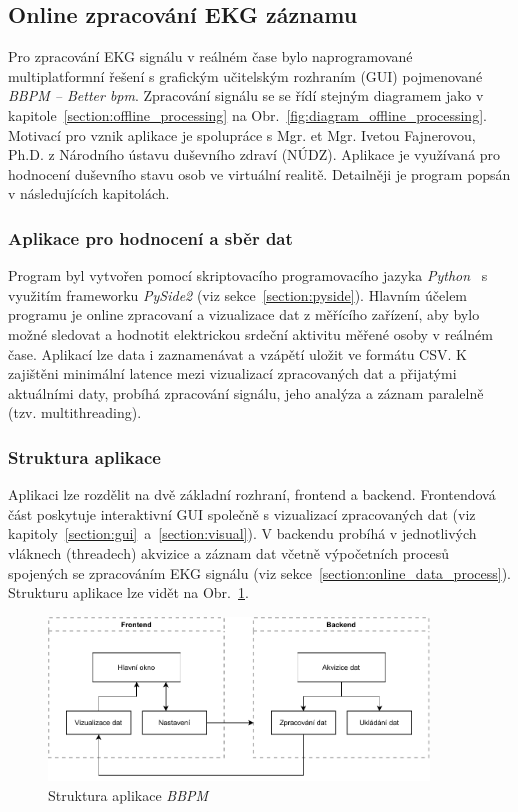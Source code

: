 \subsection{Online zpracování EKG záznamu}
\label{section:online_processing}
Pro zpracování EKG signálu v reálném čase bylo naprogramované multiplatformní
řešení s grafickým učitelským rozhraním (GUI) pojmenované \textit{BBPM -- Better
bpm}. Zpracování signálu se se řídí stejným diagramem jako v
kapitole~\ref{section:offline_processing} na
Obr.~\ref{fig:diagram_offline_processing}. Motivací pro vznik aplikace je
spolupráce s Mgr. et Mgr. Ivetou Fajnerovou, Ph.D. z Národního ústavu duševního
zdraví (NÚDZ). Aplikace je využívaná pro hodnocení duševního stavu osob ve
virtuální realitě. Detailněji je program popsán v následujících kapitolách.

\subsubsection{Aplikace pro hodnocení a sběr dat}
Program byl vytvořen pomocí skriptovacího programovacího jazyka
\textit{Python}~\cite{python} s využitím frameworku \textit{PySide2} (viz
sekce~\ref{section:pyside}). Hlavním účelem programu je online zpracovaní a
vizualizace dat z měřícího zařízení, aby bylo možné sledovat a hodnotit
elektrickou srdeční aktivitu měřené osoby v reálném čase. Aplikací lze data i
zaznamenávat a vzápětí uložit ve formátu CSV. K zajištěni minimální latence mezi
vizualizací zpracovaných dat a přijatými aktuálními daty, probíhá zpracování
signálu, jeho analýza a záznam paralelně (tzv. multithreading).

\subsubsection{Struktura aplikace}
Aplikaci lze rozdělit na dvě základní rozhraní, frontend a backend. Frontendová
část poskytuje interaktivní GUI společně s vizualizací zpracovaných dat (viz
kapitoly~\ref{section:gui}~a~\ref{section:visual}). V backendu probíhá v
jednotlivých vláknech (threadech) akvizice a záznam dat včetně výpočetních
procesů spojených se zpracováním EKG signálu (viz
sekce~\ref{section:online_data_process}). Strukturu aplikace lze vidět na
Obr.~\ref{fig:app_structure}.

\begin{figure}[h]
    \begin{center}
        \includegraphics[width=0.9\textwidth]{../assets/diagrams/app_structure}
        \caption{Struktura aplikace \textit{BBPM}}
        \label{fig:app_structure}
    \end{center}
\end{figure}

